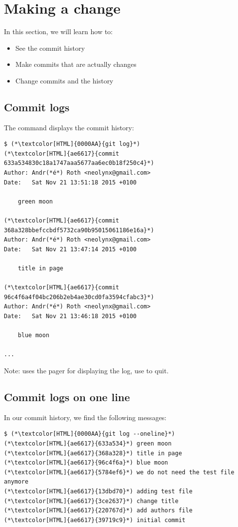 \section{Making a change}
\begin{frame}[fragile]
  \slidetitle

  In this section, we will learn how to:
  \begin{itemize}
    \item See the commit history
    \item Make commits that are actually changes
    \item Change commits and the history
  \end{itemize}
\end{frame}

\subsection{Commit logs}
\begin{frame}[fragile]
  \subslidetitle

  The command  displays the commit history:
  \begin{lstlisting}
$ (*\textcolor[HTML]{0000AA}{git log}*)
(*\textcolor[HTML]{ae6617}{commit 633a534830c18a1747aaa5677aa6ec0b18f250c4}*)
Author: Andr(*é*) Roth <neolynx@gmail.com>
Date:   Sat Nov 21 13:51:18 2015 +0100

    green moon

(*\textcolor[HTML]{ae6617}{commit 368a328bbefccbdf5732ca90b95015061186e16a}*)
Author: Andr(*é*) Roth <neolynx@gmail.com>
Date:   Sat Nov 21 13:47:14 2015 +0100

    title in page

(*\textcolor[HTML]{ae6617}{commit 96c4f6a4f04bc206b2eb4ae30cd0fa3594cfabc3}*)
Author: Andr(*é*) Roth <neolynx@gmail.com>
Date:   Sat Nov 21 13:46:18 2015 +0100

    blue moon

...
\end{lstlisting}
Note:  uses the pager for displaying the log, use  to quit.
\end{frame}

\subsection{Commit logs on one line}
\begin{frame}[fragile]
  \subslidetitle

  In our commit history, we find the following messages:
  \begin{lstlisting}
$ (*\textcolor[HTML]{0000AA}{git log --oneline}*)
(*\textcolor[HTML]{ae6617}{633a534}*) green moon
(*\textcolor[HTML]{ae6617}{368a328}*) title in page
(*\textcolor[HTML]{ae6617}{96c4f6a}*) blue moon
(*\textcolor[HTML]{ae6617}{5784ef6}*) we do not need the test file anymore
(*\textcolor[HTML]{ae6617}{13dbd70}*) adding test file
(*\textcolor[HTML]{ae6617}{3ce2637}*) change title
(*\textcolor[HTML]{ae6617}{220767d}*) add authors file
(*\textcolor[HTML]{ae6617}{39719c9}*) initial commit
\end{lstlisting}
\end{frame}


